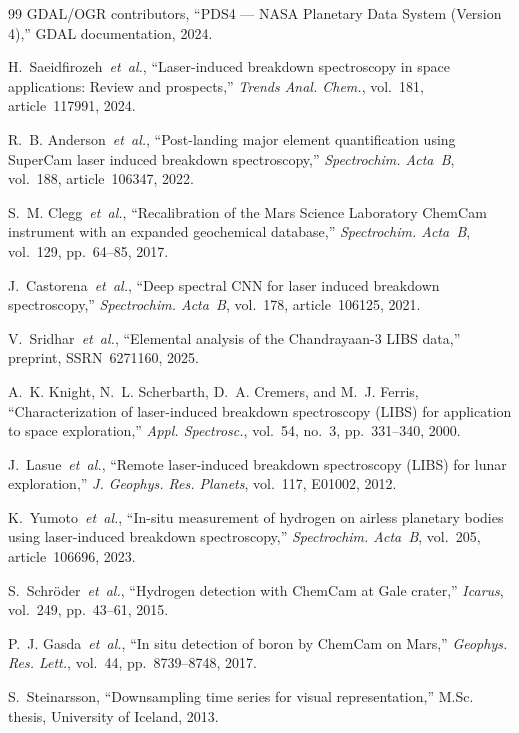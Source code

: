 \documentclass[a4paper,twocolumn,10pt]{article}
\begin{document}
\begin{thebibliography}{99}
GDAL/OGR contributors,
``PDS4 --- NASA Planetary Data System (Version 4),''
GDAL documentation, 2024.

H.~Saeidfirozeh~\emph{et~al.},
``Laser-induced breakdown spectroscopy in space applications:
Review and prospects,''
\textit{Trends Anal. Chem.}, vol.~181, article~117991, 2024.

R.~B. Anderson~\emph{et~al.},
``Post-landing major element quantification using SuperCam laser
induced breakdown spectroscopy,''
\textit{Spectrochim. Acta~B}, vol.~188, article~106347, 2022.

S.~M. Clegg~\emph{et~al.},
``Recalibration of the Mars Science Laboratory ChemCam instrument
with an expanded geochemical database,''
\textit{Spectrochim. Acta~B}, vol.~129, pp.~64--85, 2017.

J.~Castorena~\emph{et~al.},
``Deep spectral CNN for laser induced breakdown spectroscopy,''
\textit{Spectrochim. Acta~B}, vol.~178, article~106125, 2021.

V.~Sridhar~\emph{et~al.},
``Elemental analysis of the Chandrayaan-3 LIBS data,''
preprint, SSRN~6271160, 2025.

A.~K. Knight, N.~L. Scherbarth, D.~A. Cremers, and M.~J. Ferris,
``Characterization of laser-induced breakdown spectroscopy (LIBS)
for application to space exploration,''
\textit{Appl. Spectrosc.}, vol.~54, no.~3, pp.~331--340, 2000.

J.~Lasue~\emph{et~al.},
``Remote laser-induced breakdown spectroscopy (LIBS) for lunar
exploration,''
\textit{J. Geophys. Res. Planets}, vol.~117, E01002, 2012.

K.~Yumoto~\emph{et~al.},
``In-situ measurement of hydrogen on airless planetary bodies using
laser-induced breakdown spectroscopy,''
\textit{Spectrochim. Acta~B}, vol.~205, article~106696, 2023.

S.~Schr\"oder~\emph{et~al.},
``Hydrogen detection with ChemCam at Gale crater,''
\textit{Icarus}, vol.~249, pp.~43--61, 2015.

P.~J. Gasda~\emph{et~al.},
``In situ detection of boron by ChemCam on Mars,''
\textit{Geophys. Res. Lett.}, vol.~44, pp.~8739--8748, 2017.

S.~Steinarsson,
``Downsampling time series for visual representation,''
M.Sc. thesis, University of Iceland, 2013.


\end{thebibliography}
\end{document}
